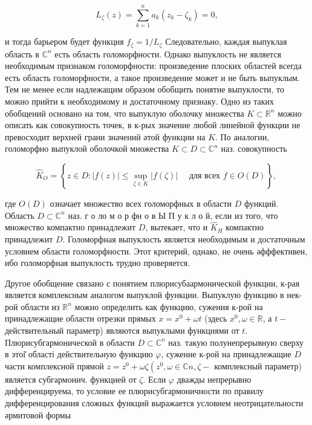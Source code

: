 \documentclass[10pt]{article}
\begin{document}
\[

L_{\zeta}(z)=\sum_{k=1}^{n} a_{k}\left(z_{k}-\zeta_{k}\right)=0,

\]



и тогда барьером будет функция $f_{\zeta}=1 / L_{\zeta}$ Следовательно, каждая выпуклая область в $\mathbb{C}^{n}$ есть область голоморфности. Однако выпуклость не является необходимым признаком голоморфности: произведение плоских областей всегда есть область голоморфности, а такое произведение может и не быть выпуклым. Тем не менее если надлежащим образом обобщить понятие выпуклости, то можно прийти к необходимому и достаточному признаку. Одно из таких обобщений основано на том, что выпуклую оболочку множества $K \subset \mathbb{R}^{n}$ можно описать как совокупность точек, в к-рых значение любой линейной функции не превосходит верхней грани значений әтой функции на $K$. По аналогии, голоморфно выпуклой оболочкой множества $K \subset D \subset \mathbb{C}^{n}$ наз. совокупность



\[

\widehat{K}_{O}=\left\{z \in D:|f(z)| \leqslant \sup _{\zeta \in K}|f(\zeta)| \quad \text { для всех } f \in O(D)\right\} \text {, }

\]



где $O(D)$ означает множество всех голоморфных в области $D$ функций. Область $D \subset \mathbb{C}^{n}$ наз. г о ло м о р фн о в Ы П у к л о й, если из того, что множество компактно принадлежит $D$, вытекает, что и $\widehat{K}_{H}$ компактно принадлежит $D$. Голоморфная выпуклость является необходимым и достаточным условием области голоморфности. Этот критерий, однако, не очень әфффективен, ибо голоморфная выпуклость трудно проверяется.



Другое обобщение связано с понятием плюрисубаармонической функции, к-рая является комплексным аналогом выпуклой функции. Выпуклую функцию в нек-рой области из $\mathbb{R}^{n}$ можно определить как функцию, сужения к-рой на принадлежащие области отрезки прямых $x=x^{0}+\omega t$ (здесь $x^{0}, \omega \in \mathbb{R}$, а $t-$ действительный параметр) являются выпуклыми функциями от $t$. Плюрисубгармонической в области $D \subset \mathbb{C}^{n}$ наз. такую полунепрерывную сверху в этоі̆ області действительную функцию $\varphi$, сужение к-рой на принадлежащие $D$ части комплексной прямой $z=z^{0}+\omega \zeta\left(z^{0}, \omega \in \mathbb{C} n, \zeta-\right.$ комплексный параметр) является субгармонич. функцией от $\zeta$. Если $\varphi$ дважды непрерывно дифференцируема, то условие ее плюрисубгармоничности по правилу дифференцирования сложных функций выражается условием неотрицательности әрмитовой формы
\end{document}
